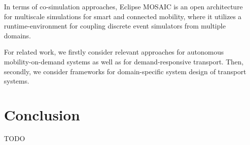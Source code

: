 \documentclass[graybox]{svmult}
\begin{document}
In terms of co-simulation approaches, Eclipse MOSAIC \cite{schunemann_v2x_2011, noauthor_eclipse_nodate} is an open architecture for multiscale simulations for smart and connected mobility, where it utilizes a runtime-environment for coupling discrete event simulators from multiple domains.

For related work, we firstly consider relevant approaches for autonomous mobility-on-demand systems as well as for demand-responsive transport. Then, secondly, we consider frameworks for domain-specific system design of transport systems.

\section{Conclusion}
\label{sec:con}
TODO



\end{document}
